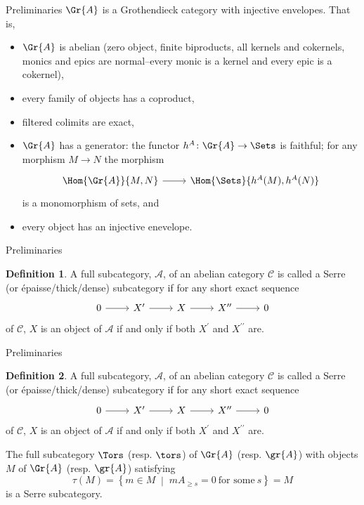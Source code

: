 \documentclass{beamer}
\theoremstyle{definition}
\newtheorem{defn}{Definition}
\newcommand{\A}{\mathscr{A}}
\renewcommand{\C}{\mathscr{C}}
\begin{document}
\begin{frame}[fragile]{Preliminaries}
  $\Gr{A}$ is a Grothendieck category with injective envelopes.
  That is,
  \begin{itemize}
  \item
    $\Gr{A}$ is abelian (zero object, finite biproducts, all kernels and cokernels, monics and epics are normal--every monic is a kernel and every epic is a cokernel),
  \item
    every family of objects has a coproduct,
  \item
    filtered colimits are exact,
  \item
    $\Gr{A}$ has a generator: the functor $h^A \colon \Gr{A} \rightarrow \Sets$ is faithful; for any morphism $M \rightarrow N$ the morphism
    $$\begin{tikzcd}
      \Hom{\Gr{A}}{M, N} \arrow{r}& \Hom{\Sets}{h^A(M), h^A(N)}
    \end{tikzcd}$$
    is a monomorphism of sets, and
  \item
    every object has an injective enevelope.
  \end{itemize}
\end{frame}

\begin{frame}[fragile]{Preliminaries}
  \begin{defn}
    A full subcategory, $\A$, of an abelian category $\C$ is called a Serre (or \'{e}paisse/thick/dense) subcategory if for any short exact sequence
    $$\begin{tikzcd}
      0 \arrow{r} & X^\prime \arrow{r} & X \arrow{r} & X^{\prime\prime} \arrow{r} & 0
    \end{tikzcd}$$
    of $\C$, $X$ is an object of $\A$ if and only if both $X^\prime$ and $X^{\prime\prime}$ are.
  \end{defn}
\end{frame}

\begin{frame}[fragile]{Preliminaries}
  \setcounter{defn}{0}
  \begin{defn}
    A full subcategory, $\A$, of an abelian category $\C$ is called a Serre (or \'{e}paisse/thick/dense) subcategory if for any short exact sequence
    $$\begin{tikzcd}
      0 \arrow{r} & X^\prime \arrow{r} & X \arrow{r} & X^{\prime\prime} \arrow{r} & 0
    \end{tikzcd}$$
    of $\C$, $X$ is an object of $\A$ if and only if both $X^\prime$ and $X^{\prime\prime}$ are.
  \end{defn}
  The full subcategory $\Tors$ (resp. $\tors$) of $\Gr{A}$ (resp. $\gr{A}$) with objects $M$ of $\Gr{A}$ (resp. $\gr{A}$) satisfying
  $$\tau(M) = \left\{m \in M \;\middle\vert\; mA_{\geq s} = 0\ \text{for some}\ s\right\} = M$$
  is a Serre subcategory.
\end{frame}
\end{document}
